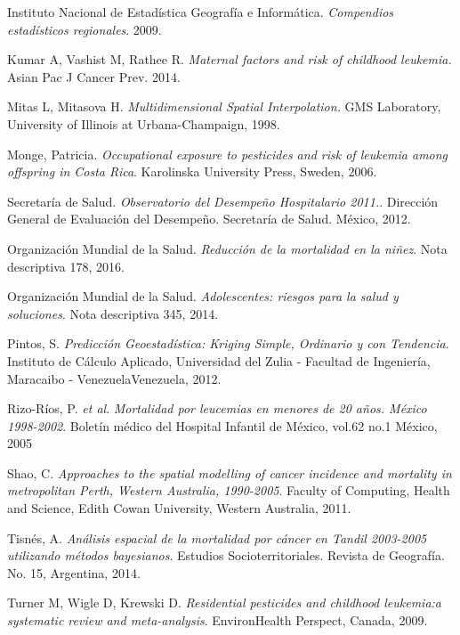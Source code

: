 \documentclass[11pt, oneside]{book}
\begin{document}
\begin{thebibliography}{9}
  Instituto Nacional de Estadística Geografía e Informática.
  \emph{Compendios estadísticos regionales}. 2009.

  Kumar A, Vashist M, Rathee R.
  \emph{Maternal factors and risk of childhood leukemia.} Asian Pac J Cancer Prev. 2014.

  Mitas L, Mitasova H.
  \emph{Multidimensional Spatial Interpolation.} GMS Laboratory, University of Illinois at Urbana-Champaign, 1998.

  Monge, Patricia.
  \emph{Occupational exposure to pesticides and risk of leukemia among offspring in Costa Rica}. Karolinska University Press, Sweden, 2006.

  Secretaría  de  Salud.
  \emph{Observatorio  del  Desempeño  Hospitalario  2011.}. Dirección  General  de  Evaluación  del Desempeño.  Secretaría de Salud. México, 2012.

  Organización Mundial de la Salud.
  \emph{Reducción de la mortalidad en la niñez}. Nota descriptiva 178, 2016.

  Organización Mundial de la Salud.
  \emph{Adolescentes: riesgos para la salud y soluciones}. Nota descriptiva 345, 2014.

  
  Pintos, S.
  \emph{Predicción Geoestadística: Kriging Simple, Ordinario y con Tendencia}. Instituto de Cálculo Aplicado, Universidad del Zulia - Facultad de Ingeniería, Maracaibo - VenezuelaVenezuela, 2012.

  Rizo-Ríos, P. \emph{et al}.
  \emph{Mortalidad por leucemias en menores de 20 años. México 1998-2002}. Boletín médico del Hospital Infantil de México, vol.62 no.1 México, 2005

  Shao, C.
  \emph{Approaches to the spatial modelling of cancer incidence and mortality in metropolitan Perth, Western Australia, 1990-2005}. Faculty of Computing, Health and Science, Edith Cowan University, Western Australia, 2011.

  Tisnés, A.
  \emph{Análisis espacial de la mortalidad por cáncer en Tandil 2003-2005 utilizando métodos bayesianos}. Estudios Socioterritoriales. Revista de Geografía. No. 15, Argentina, 2014.
  
  Turner M, Wigle D, Krewski D.
  \emph{Residential pesticides and childhood leukemia:a systematic review and meta-analysis}. EnvironHealth Perspect, Canada, 2009.  


\end{thebibliography}
\end{document}
